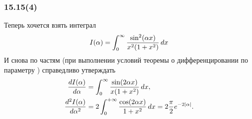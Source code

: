 \subsubsection*{15.15(4)}

Теперь хочется взять интеграл
\begin{equation*}
    I(\alpha) = \int_0^\infty \frac{\sin^2 (\alpha x)}{x^2 (1+x^2)} \, d x
\end{equation*}
И снова по частям (при выполнении условий теоремы о дифференцировании по параметру \red{[!]}) справедливо утверждать
\begin{align*}
    \frac{d I(\alpha)}{d \alpha}  
    &= \int_0^\infty \frac{\sin (2 \alpha x)}{x (1+x^2)} \, d x, \\
    \frac{d^2 I(\alpha)}{d \alpha^2} &= 2 \int_{0}^{+\infty} 
    \frac{\cos(2 \alpha x)}{1+x^2} \, d x = 2 \frac{\pi}{2} e^{-2 |\alpha|}.
\end{align*}
